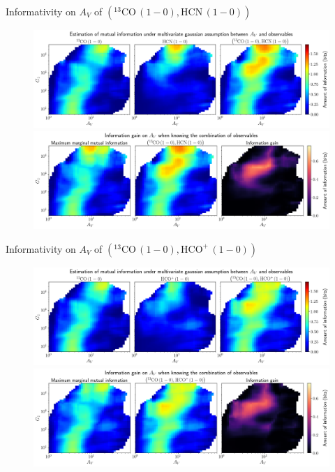 \documentclass{beamer}
\begin{document}
\begin{frame}{Informativity on $A_V$ of $\left(\mathrm{^{13}CO\,(1-0)},\mathrm{HCN\,(1-0)}\right)$}
    \begin{figure}
        \centering
        \includegraphics[width=0.95\linewidth]{../linearinfo/av__13co10_hcn10_linearinfo.png}
        \vfill
        \includegraphics[width=0.95\linewidth]{../linearinfo/av__13co10_hcn10_linearinfo_gain.png}
    \end{figure}
\end{frame}

\begin{frame}{Informativity on $A_V$ of $\left(\mathrm{^{13}CO\,(1-0)},\mathrm{HCO^+\,(1-0)}\right)$}
    \begin{figure}
        \centering
        \includegraphics[width=0.95\linewidth]{../linearinfo/av__13co10_hcop10_linearinfo.png}
        \vfill
        \includegraphics[width=0.95\linewidth]{../linearinfo/av__13co10_hcop10_linearinfo_gain.png}
    \end{figure}
\end{frame}
\end{document}

